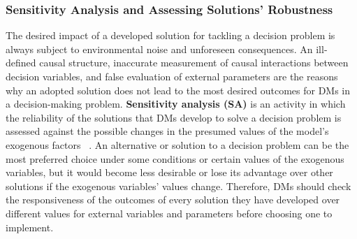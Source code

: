 \documentclass{sfuthesis}
\begin{document}
\subsubsection{Sensitivity Analysis and Assessing Solutions' Robustness}
The desired impact of a developed solution for tackling a decision problem is always subject to environmental noise and unforeseen consequences. An ill-defined causal structure, inaccurate measurement of causal interactions between decision variables, and false evaluation of external parameters are the reasons why an adopted solution does not lead to the most desired outcomes for DMs in a decision-making problem. \textbf{Sensitivity analysis (SA)} is an activity in which the reliability of the solutions that DMs develop to solve a decision problem is assessed against the possible changes in the presumed values of the model’s exogenous factors ~\cite{rappaport1967sensitivity,hekimouglu2010sensitivity}. An alternative or solution to a decision problem can be the most preferred choice under some conditions or certain values of the exogenous variables, but it would become less desirable or lose its advantage over other solutions if the exogenous variables’ values change. Therefore, DMs should check the responsiveness of the outcomes of every solution they have developed over different values for external variables and parameters before choosing one to implement.\par
\end{document}
